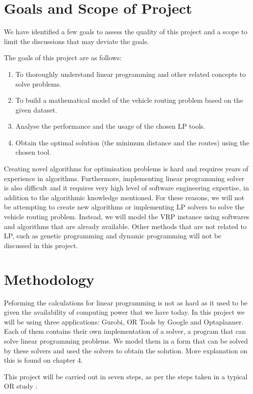 \section{Goals and Scope of Project}
We have identified a few goals to assess the quality of this project and a scope to limit the discussions that may deviate the goals.

The goals of this project are as follows:
\begin{enumerate}
\item To thoroughly understand linear programming and other related concepts to solve problems.
\item To build a mathematical model of the vehicle routing problem based on the given dataset.
\item Analyse the performance and the usage of the chosen LP tools.
\item Obtain the optimal solution (the minimum distance and the routes) using the chosen tool.
\end{enumerate}

Creating novel algorithms for optimisation problems is hard and requires years of experience in algorithms. Furthermore,
implementing linear programming solver is also difficult and it requires very high level of software engineering expertise, in addition to
the algorithmic knowledge mentioned. For these reasons, we will not be attempting to create new algorithms or implementing LP solvers to solve
the vehicle routing problem. Instead, we will model the VRP instance using softwares and algorithms that are already available.
Other methods that are not related to LP, such as genetic programming and dynamic programming will not be discussed in this project.

\section{Methodology}
Peforming the calculations for linear programming is not as hard as it used to be given the availability of computing power that we have today.
In this project we will be using three applications: Gurobi, OR Tools by Google and Optaplanner. Each of them
contains their own implementation of a solver, a program that can solve linear programming problems. We model them
in a form that can be solved by these solvers and used the solvers to obtain the solution. More explanation on this is found on chapter 4.

This project will be carried out in seven steps, as per the steps taken in a typical OR study \cite{Sottinen2009}:

